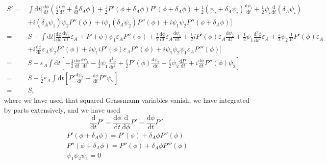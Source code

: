 \begin{align}
    S'=& \int \text{d}t \bigg [\frac{\text{d} \phi}{\text{d} t} \left(\frac{i}{2}\frac{\text{d}\phi}{\text{d} t} + \frac{\text{d}}{\text{d}t}\delta_A \phi\right) + \frac{1}{2}P'(\phi+ \delta_A\phi)P'(\phi + \delta_A\phi) + \frac{1}{2}(\psi_i + \delta_A \psi_i) \frac{\text{d}\psi_i}{\text{d}t} + \frac{1}{2}\psi_i \frac{\text{d}}{\text{d}t}(\delta_A \psi_i)\nonumber \\
    &+ i(\delta_A \psi_1)\psi_2 P''(\phi) + i \psi_1 (\delta_A \psi_2) P''(\phi) + i \psi_1 \psi_2 P''(\phi + \delta_A \phi)\bigg] \nonumber \\
    =& S + \int \text{d} t \bigg [\frac{\text{d}\phi}{\text{d}t} \frac{\text{d}\psi_1}{\text{d}t}\varepsilon_A + P'(\phi) \psi_1 \varepsilon_A P''(\phi) + \frac{1}{2}\frac{\text{d}\phi}{\text{d}t} \varepsilon_A \frac{\text{d}\psi_1}{\text{d}t} + \frac{1}{2}i P'(\phi) \varepsilon_A \frac{\text{d}\psi_2}{\text{d}t} + \frac{1}{2}\psi_1 \frac{\text{d}^2\phi}{\text{d}t^2}\varepsilon_A + \frac{i}{2}\psi_2 \frac{\text{d}}{\text{d}t}P'(\phi) \varepsilon_A \nonumber \\
    &+ i \frac{\text{d}\phi}{\text{d}t} \varepsilon_A \psi_2 P''(\phi) + i \psi_1 i P'(\phi) \varepsilon_A P''(\phi) + i \psi_1 \psi_2 \psi_1 \varepsilon_A P'''(\phi)\bigg] \nonumber \\
    = & S + \varepsilon_A \int \text{d}t \left[- \frac{1}{2}\frac{\text{d}\phi}{\text{d}t}\frac{\text{d}\psi_1}{\text{d}t} - \frac{1}{2}\psi_1 \frac{\text{d}^2 \phi}{\text{d}t^2} + \frac{i}{2}P'(\phi)\frac{\text{d}\psi_2}{\text{d}t} - \frac{i}{2}\psi_2 \frac{\text{d}P'}{\text{d}t} + i \frac{\text{d}\phi}{\text{d}t}P''(\phi) \psi_2 \right] \nonumber \\
    =& S + \frac{i}{2} \varepsilon_A \int \text{d}t \left [P' \frac{\text{d} \psi_2}{\text{d}t} + \frac{\text{d}\phi}{\text{d}t}P'' \psi_2 \right] 
    \nonumber \\
    =& S,
\end{align}
where we have used that squared Grassmann variables vanish, we have integrated by parts extensively, and we have used
\begin{equation}
\label{eq:leib}
    \frac{\text{d}}{\text{d}t}P' = \frac{\text{d}\phi}{\text{d}t}\frac{\text{d}}{\text{d}\phi}P' = \frac{\text{d}\phi}{\text{d}t} P''.
\end{equation}
\begin{align}
    P'(\phi+\delta_A\phi)=P'(\phi)+\delta_A\phi P''(\phi)\\
    P''(\phi+\delta_A\phi)=P''(\phi)+\delta_A\phi P'''(\phi)\\
    \psi_1\psi_2\psi_1=0
\end{align}
